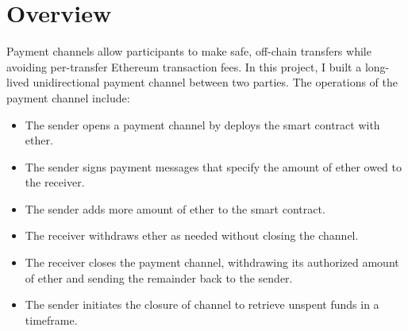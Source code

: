 \section{Overview}\label{sec:overview}
Payment channels allow participants to make safe, off-chain transfers while avoiding per-transfer Ethereum transaction
fees.
In this project, I built a long-lived unidirectional payment channel between two parties.
The operations of the payment channel include:
\begin{itemize}
    \item The sender opens a payment channel by deploys the smart contract with ether.
    \item The sender signs payment messages that specify the amount of ether owed to the receiver.
    \item The sender adds more amount of ether to the smart contract.
    \item The receiver withdraws ether as needed without closing the channel.
    \item The receiver closes the payment channel, withdrawing its authorized amount of ether and sending the remainder
    back to the sender.
    \item The sender initiates the closure of channel to retrieve unspent funds in a timeframe.
\end{itemize}